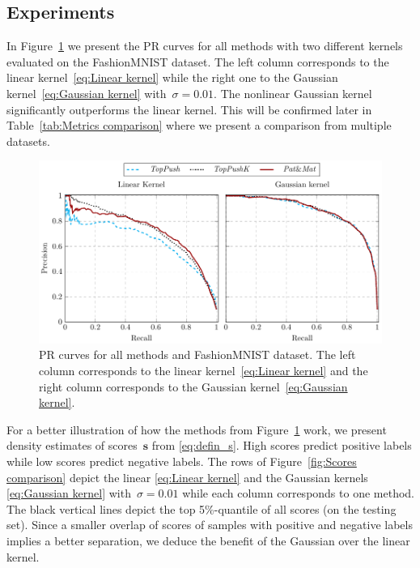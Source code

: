 \subsection{Experiments}

In Figure~\ref{fig:PR comparison} we present the PR curves for all methods with two different kernels evaluated on the FashionMNIST dataset. The left column corresponds to the linear kernel~\eqref{eq:Linear kernel} while the right one to the Gaussian kernel~\eqref{eq:Gaussian kernel} with~$\sigma = 0.01$. The nonlinear Gaussian kernel significantly outperforms the linear kernel. This will be confirmed later in Table~\ref{tab:Metrics comparison} where we present a comparison from multiple datasets. 

\begin{figure}[!ht]
  \centering
  \includegraphics[width = \linewidth]{images/dual_results1.pdf}
  \caption{PR curves for all methods and  FashionMNIST dataset. The left column corresponds to the linear kernel~\eqref{eq:Linear kernel} and the right column corresponds to the Gaussian kernel~\eqref{eq:Gaussian kernel}.}
  \label{fig:PR comparison}
\end{figure}

For a better illustration of how the methods from Figure~\ref{fig:PR comparison} work, we present density estimates of scores~$\bm s$ from \eqref{eq:defin_s}. High scores predict positive labels while low scores predict negative labels. The rows of Figure~\ref{fig:Scores comparison} depict the linear \eqref{eq:Linear kernel} and the Gaussian kernels \eqref{eq:Gaussian kernel} with~$\sigma = 0.01$ while each column corresponds to one method. The black vertical lines depict the top 5\%-quantile of all scores (on the testing set). Since a smaller overlap of scores of samples with positive and negative labels implies a better separation, we deduce the benefit of the Gaussian over the linear kernel.

